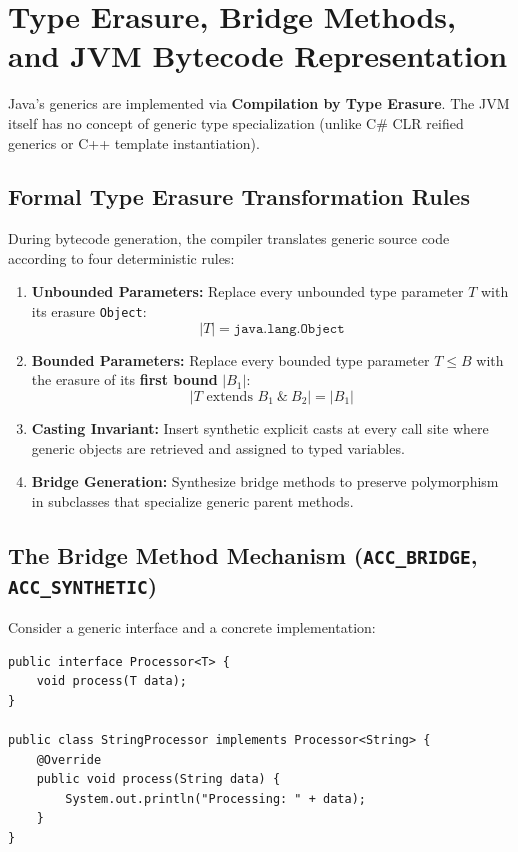 \documentclass[10pt,journal,compsoc,onecolumn]{IEEEtran}
\begin{document}
\section{Type Erasure, Bridge Methods, and JVM Bytecode Representation}
\label{sec:erasure}

Java's generics are implemented via \textbf{Compilation by Type Erasure}. The JVM itself has no concept of generic type specialization (unlike C\# CLR reified generics or C++ template instantiation).

\subsection{Formal Type Erasure Transformation Rules}
During bytecode generation, the compiler translates generic source code according to four deterministic rules:
\begin{enumerate}
    \item \textbf{Unbounded Parameters:} Replace every unbounded type parameter $T$ with its erasure \texttt{Object}:
    \begin{equation}
    |T| = \texttt{java.lang.Object}
    \end{equation}
    \item \textbf{Bounded Parameters:} Replace every bounded type parameter $T \le B$ with the erasure of its \textbf{first bound} $|B_1|$:
    \begin{equation}
    |T \text{ extends } B_1 \ \& \ B_2| = |B_1|
    \end{equation}
    \item \textbf{Casting Invariant:} Insert synthetic explicit casts at every call site where generic objects are retrieved and assigned to typed variables.
    \item \textbf{Bridge Generation:} Synthesize bridge methods to preserve polymorphism in subclasses that specialize generic parent methods.
\end{enumerate}

\subsection{The Bridge Method Mechanism (\texttt{ACC\_BRIDGE}, \texttt{ACC\_SYNTHETIC})}
Consider a generic interface and a concrete implementation:
\begin{lstlisting}[caption={Generic Specialization Requiring Synthetic Bridge}]
public interface Processor<T> {
    void process(T data);
}

public class StringProcessor implements Processor<String> {
    @Override
    public void process(String data) {
        System.out.println("Processing: " + data);
    }
}
\end{lstlisting}
\end{document}
